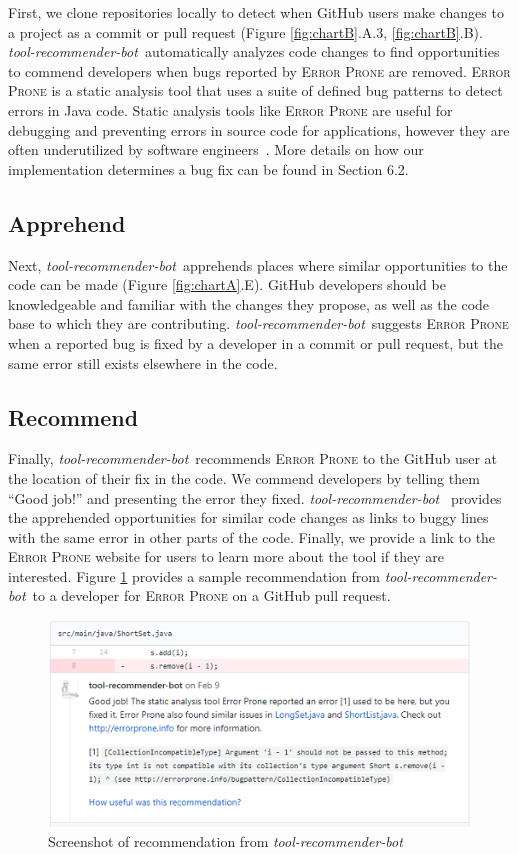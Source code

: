 \documentclass[sigconf,review,anonymous]{acmart}
\newcommand{\tool}{\textsl{tool-recommender-bot}}
\begin{document}
First, we clone repositories locally to detect when GitHub users make changes to a project as a commit or pull request (Figure \ref{fig:chartB}.A.3,  \ref{fig:chartB}.B). \tool~automatically analyzes code changes to find opportunities to commend developers when bugs reported by \textsc{Error Prone} are removed. \textsc{Error Prone} is a static analysis tool that uses a suite of defined bug patterns to detect errors in Java code. Static analysis tools like \textsc{Error Prone} are useful for debugging and preventing errors in source code for applications, however they are often underutilized by software engineers~\cite{Johnson2013Why}. More details on how our implementation determines a bug fix can be found in Section 6.2.

\subsection{Apprehend}

Next, \tool~apprehends places where similar opportunities to the code can be made (Figure \ref{fig:chartA}.E). GitHub developers should be knowledgeable and familiar with the changes they propose, as well as the code base to which they are contributing. \tool~suggests \textsc{Error Prone} when a reported bug is fixed by a developer in a commit or pull request, but the same error still exists elsewhere in the code. 

\subsection{Recommend}

Finally, \tool~recommends \textsc{Error Prone} to the GitHub user at the location of their fix in the code. We commend developers by telling them ``Good job!'' and presenting the error they fixed. \tool~ provides the apprehended opportunities for similar code changes as links to buggy lines with the same error in other parts of the code. Finally, we provide a link to the \textsc{Error Prone} website for users to learn more about the tool if they are interested. Figure \ref{fig:tool} provides a sample recommendation from \tool~to a developer for \textsc{Error Prone} on a GitHub pull request.

\begin{figure}
	\includegraphics[width=\textwidth]{images/screenshot.png}
	\caption{Screenshot of recommendation from \tool}	
	\label{fig:tool} 
\end{figure}
\end{document}
